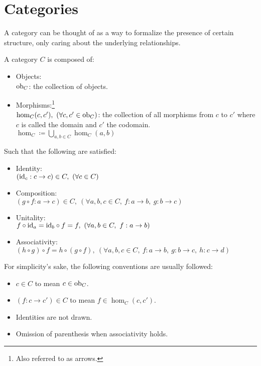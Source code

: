 \section{Categories}
A category can be thought of as a way to formalize the presence of certain
structure, only caring about the underlying relationships.

\begin{definition}
  A category $C$ is composed of: \parencite{fong_spivak:7sketches}
  \begin{itemize}
    \item Objects:\\
      $\mathrm{ob}_C$: the collection of objects.
    \item Morphisms:\footnote{Also referred to as arrows.}\\
      $\hom_C(c, c'),\ (\forall c, c' \in \mathrm{ob}_C)$: the collection of all
      morphisms from $c$ to $c'$ where $c$ is called the domain and $c'$ the
      codomain.\\
      $\hom_C \coloneqq \bigcup\limits_{a,b\in C} \hom_C(a,b)$
  \end{itemize}

  Such that the following are satisfied:
  \begin{itemize}
    \item Identity:\\
      $(\mathrm{id}_c: c \to c) \in C,\ (\forall c \in C)$
    \item Composition:\\
      $(g \circ f : a \to c) \in C,
        \ (\forall a, b, c \in C,\ f: a \to b,\ g:b \to c)$
    \item Unitality:\\
      $f \circ \mathrm{id}_a = \mathrm{id}_b \circ f = f,
        \ (\forall a, b \in C,\ f: a \to b)$
    \item Associativity:\\
      $(h \circ g) \circ f = h \circ (g \circ f), \ (\forall a,b,c\in C,\ f:a\to
        b,\ g:b\to c,\ h:c\to d)$
  \end{itemize}
\end{definition}

\begin{remark}
  For simplicity's sake, the following conventions are usually followed:
  \begin{itemize}
    \item $c\in C$ to mean $c\in\mathrm{ob}_C$.
    \item $(f: c\to c')\in C$ to mean $f\in \hom_C(c, c')$.
    \item Identities are not drawn.
    \item Omission of parenthesis when associativity holds.
  \end{itemize}
\end{remark}

